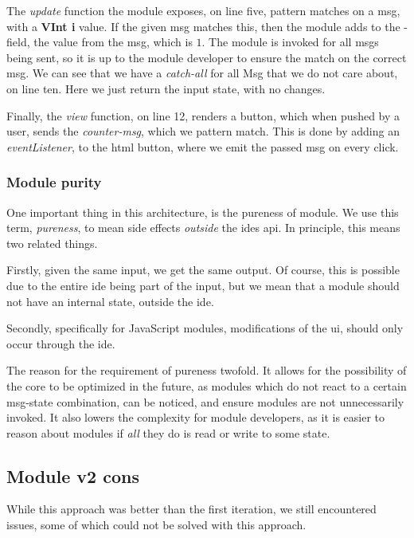 The \textit{update} function the module exposes, on line five, pattern matches
on a  msg, with a \textbf{VInt i} value. If the given msg matches
this, then the module adds to the -field, the value from the msg,
which is $1$. The module is invoked for all msgs being sent, so it is up to the
module developer to ensure the match on the correct msg. We can see that we
have a \textit{catch-all} for all Msg that we do not care about, on line ten.
Here we just return the input state, with no changes.

Finally, the \textit{view} function, on line 12, renders a button, which when pushed by a
user, sends the \textit{counter-msg}, which we pattern match. This is done by
adding an \textit{eventListener}, to the \gls*{html} button, where we emit the
passed msg on every click.


\subsubsection{Module purity}

One important thing in this architecture, is the pureness of module. We use this
term, \textit{pureness}, to mean side effects \textit{outside} the \gls*{ide}s
\gls*{api}. In principle, this means two related things.

Firstly, given the same input, we get the same output. Of course, this is
possible due to the entire \gls*{ide} being part of the input, but we mean that
a module should not have an internal state, outside the \gls*{ide}.

Secondly, specifically for JavaScript modules, modifications of the \gls*{ui},
should only occur through the \gls*{ide}.

The reason for the requirement of pureness twofold. It allows for the
possibility of the core to be optimized in the future, as modules which do not
react to a certain msg-state combination, can be noticed, and ensure modules are
not unnecessarily invoked. It also lowers the complexity for module developers,
as it is easier to reason about modules if \textit{all} they do is read or write
to some state.


\subsection{Module v2 cons}

While this approach was better than the first iteration, we still encountered
issues, some of which could not be solved with this approach.


